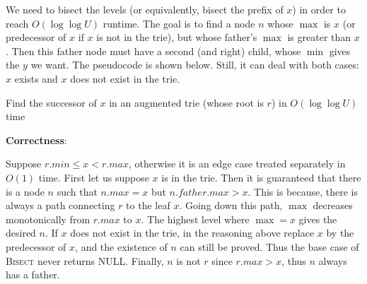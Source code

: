 \documentclass{article}
\begin{document}
We need to bisect the levels (or equivalently, bisect the prefix of $x$) in order to reach $O(\log\log U)$ runtime. The goal is to find a node $n$ whose $\max$ is $x$ (or predecessor of $x$ if $x$ is not in the trie), but whose father's $\max$ is greater than $x$. Then this father node must have a second (and right) child, whose $\min$ gives the $y$ we want. The pseudocode is shown below. Still, it can deal with both cases: $x$ exists and $x$ does not exist in the trie.
\begin{algorithm}
\caption{Find the successor of $x$ in an augmented trie (whose root is $r$) in $O(\log\log U)$ time}
\begin{algorithmic}[1]
	\State{}
\Else{}
	\State{}
\EndIf
\EndProcedure
\State{}
\State{}
\State{}
	\State{}
	\Else
		\State{}
	\Else{}
	\EndIf
\EndIf
\EndProcedure
\end{algorithmic}
\end{algorithm}

\noindent\textbf{Correctness}:

Suppose $r.min\leqslant x<r.max$, otherwise it is an edge case treated separately in $O(1)$ time. First let us suppose $x$ is in the trie. Then it is guaranteed that there is a node $n$ such that $n.max=x$ but $n.father.max>x$. This is because, there is always a path connecting $r$ to the leaf $x$. Going down this path, $\max$ decreases monotonically from $r.max$ to $x$. The highest level where $\max=x$ gives the desired $n$. If $x$ does not exist in the trie, in the reasoning above replace $x$ by the predecessor of $x$, and the existence of $n$ can still be proved. Thus the base case of \textsc{Bisect} never returns NULL. Finally, $n$ is not $r$ since $r.max>x$, thus $n$ always has a father.
\end{document}
